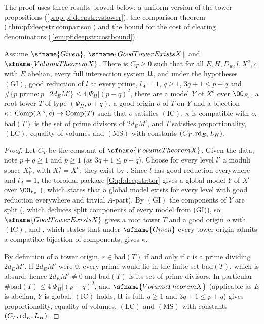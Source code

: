 The proof uses three results proved below: a uniform version of the tower propositions
(\cref{prop:pf:deepstr:vstower}), the comparison theorem (\cref{thm:pf:deepstr:comparison}) and the bound
for the cost of clearing denominators (\cref{lem:pf:deepstr:costbound}).

\begin{proposition}\label{prop:pf:deepstr:vstower}
Assume $\sfname{Given}$, $\sfname{GoodTowerExistsX}$ and $\sfname{VolumeTheoremX}$. There is $C_T\ge0$ such
that for all $E,H,D_w,l,X^o,c$ with $E$ abelian, every full intersection system $\mathrm{II}$, and under the
hypotheses $\mathrm{(GI)}$, good reduction of $l$ at every prime, $l_A=1$, $q\ge1$, $3q+1\le p+q$ and
$\#\{p\text{ prime}:p\mid2d_EM'\}\le4|\Psi_H|(p+q)^2$, there are a model $Y$ of $X^o$ over $\OO_{F_c}$, a root
tower $T$ of type $(\Psi_H,p+q)$, a good origin $o$ of $T$ on $Y$ and a bijection
$\kappa\colon\operatorname{Comp}(X^o,c)\to\operatorname{Comp}(T)$ such that $o$ satisfies $\mathrm{(IC)}$, $\kappa$ is compatible
with $o$, $\mathrm{bad}(T)$ is the set of
prime divisors of $2d_EM'$, and $T$ satisfies proportionality, $\mathrm{(LC)}$, equality of volumes and
$\mathrm{(MS)}$ with constants $(C_T,\operatorname{rd}_E,L_H)$.
\end{proposition}

\begin{proof}
Let $C_T$ be the constant of $\sfname{VolumeTheoremX}$. Given the data, note $p+q\ge1$ and $p\ge1$ (as
$3q+1\le p+q$). Choose for every level $l'$ a moduli space $X^o_{l'}$, with $X^o_l=X^o$; they exist by
. Since $l$ has good reduction everywhere and $l_A=1$,
the toroidal package \ref{G:pf:deepstr:tor} gives a global model $Y$ of $X^o$ over $\OO_{F_c}$
(, which states that a global model exists for
every level with good reduction everywhere and trivial $A$-part). By $\mathrm{(GI)}$ the components of $Y$ are split
(, which deduces split components of every model
from (GI)), so $\sfname{GoodTowerExistsX}$ gives a root tower
$T$ and a good origin $o$ with $\mathrm{(IC)}$, and , which
states that under $\sfname{Given}$ every tower origin admits a compatible bijection of components, gives
$\kappa$.

By definition of a tower origin, $r\in\mathrm{bad}(T)$ if and only if $r$ is a prime dividing $2d_EM'$. If
$2d_EM'$ were $0$, every prime would lie in the finite set $\mathrm{bad}(T)$, which is absurd; hence
$2d_EM'\ne0$ and $\mathrm{bad}(T)$ is its set of prime divisors. In particular
$\#\mathrm{bad}(T)\le4|\Psi_H|(p+q)^2$, and $\sfname{VolumeTheoremX}$ (applicable as $E$ is abelian, $Y$ is
global, $\mathrm{(IC)}$ holds, $\mathrm{II}$ is full, $q\ge1$ and $3q+1\le p+q$) gives proportionality,
equality of volumes, $\mathrm{(LC)}$ and $\mathrm{(MS)}$ with constants $(C_T,\operatorname{rd}_E,L_H)$.
\end{proof}

